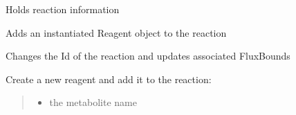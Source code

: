\documentclass[letterpaper,10pt,english]{sphinxmanual}
\begin{document}
\begin{fulllineitems}
\label{\detokenize{modules_doc:cbmpy.CBModel.Reaction}}
\pysigstartsignatures
{}
\pysigstopsignatures
\sphinxAtStartPar
Holds reaction information

\begin{fulllineitems}
\label{\detokenize{modules_doc:cbmpy.CBModel.Reaction.addReagent}}
\pysigstartsignatures
{}
\pysigstopsignatures
\sphinxAtStartPar
Adds an instantiated Reagent object to the reaction

\end{fulllineitems}


\begin{fulllineitems}
\label{\detokenize{modules_doc:cbmpy.CBModel.Reaction.changeId}}
\pysigstartsignatures
{}
\pysigstopsignatures
\sphinxAtStartPar
Changes the Id of the reaction and updates associated FluxBounds

\end{fulllineitems}


\begin{fulllineitems}
\label{\detokenize{modules_doc:cbmpy.CBModel.Reaction.createReagent}}
\pysigstartsignatures
{}
\pysigstopsignatures
\sphinxAtStartPar
Create a new reagent and add it to the reaction:
\begin{quote}
\begin{itemize}
\item {} 
\sphinxAtStartPar
{} the metabolite name


\end{itemize}
\end{quote}
\end{fulllineitems}
\end{fulllineitems}
\end{document}
